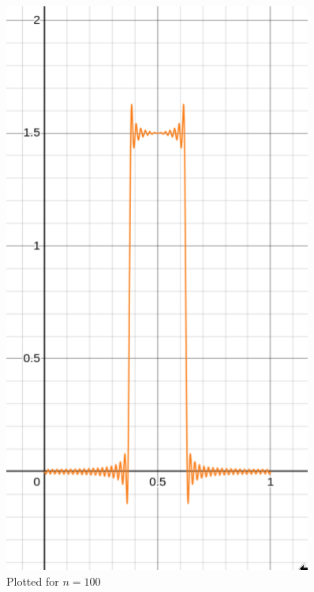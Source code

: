 \documentclass[letter]{article}
\begin{document}
\begin{minipage}{0.3\textwidth}
\begin{figure}[H]
	\centering
	\includegraphics[width=0.9\textwidth]{ss/speed04.png}
	\caption{Plotted for $n = 100$}
	\label{fig:ss-speed01-png}
\end{figure}
\end{minipage}
\hfill
\end{document}
